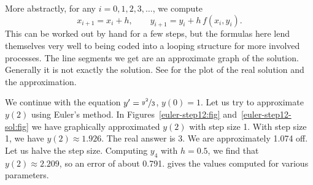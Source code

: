 \documentclass{ximera}
\begin{document}
\begin{myfig}
    \capstart
    \caption{First two steps of Euler's method with $h=1$ for the equation $y' = \frac{y^2}{3}$ with initial conditions $y(0)=1$.%
    \label{euler-step12:fig}}
\end{myfig}

More abstractly, for any $i=0,1,2,3,\ldots$, we compute
\begin{equation*}
    x_{i+1} = x_i + h , \qquad y_{i+1}  = y_i + h\, f(x_i,y_i) .
\end{equation*}
This can be worked out by hand for a few steps, but the formulas here lend themselves very well to being coded into a looping structure for more involved processes. The line segments we get are an approximate graph of the solution. Generally it is not exactly the solution.  See  for the plot of the real solution and the approximation.

\begin{myfig}
    \capstart
    \caption{Two steps of Euler's method (step size 1) and the exact solution for the equation $y' = \frac{y^2}{3}$ with initial conditions $y(0)=1$.
    \label{euler-step12-sol:fig}}
\end{myfig}

We continue with the equation $y' = \nicefrac{y^2}{3}$, $y(0)=1$. Let us try to approximate $y(2)$ using Euler's method.  In Figures~\ref{euler-step12:fig} and~\ref{euler-step12-sol:fig} we have  graphically approximated $y(2)$ with step size 1.  With step size 1, we have $y(2) \approx 1.926$.  The real answer is 3.  We are approximately 1.074 off.  Let us halve the step size.
Computing $y_4$ with $h=0.5$, we find that $y(2) \approx 2.209$, so an error of about 0.791.  gives the values computed for various parameters.
\end{document}
